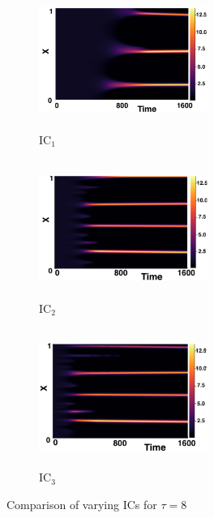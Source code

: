 \documentclass[12pt]{report}
\begin{document}
\begin{figure}[H]
    \centering
    \begin{subfigure}[b]{0.32\textwidth}
        \centering
        \includegraphics[width=5.5cm,height=4.5cm]{gaff8.png}
        \caption{$\text{IC}_1$}
        \label{}
    \end{subfigure}
    \hfill
    \begin{subfigure}[b]{0.32\textwidth}
        \centering
        \includegraphics[width=5.5cm,height=4.5cm]{ic28.png}
        \caption{$\text{IC}_2$}
        \label{}
    \end{subfigure}
    \hfill
    \begin{subfigure}[b]{0.32\textwidth}
        \centering
        \includegraphics[width=5.5cm,height=4.5cm]{ic38.png}
        \caption{$\text{IC}_3$}
        \label{}
    \end{subfigure}
    \caption{Comparison of varying ICs for $\tau=8$}
    \label{fig:figtau8}
\end{figure}
\end{document}

